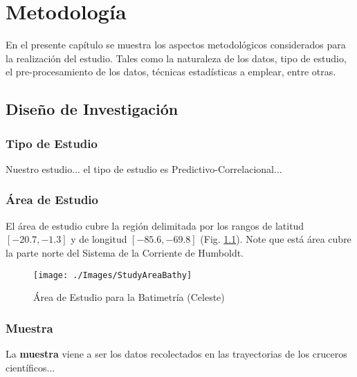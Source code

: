 \chapter{Metodología}
\thispagestyle{empty}
En el presente capítulo se muestra los aspectos metodológicos considerados para la realización del estudio. Tales como la naturaleza de los datos, tipo de estudio, el pre-procesamiento de los datos, técnicas estadísticas a emplear, entre otras.

\section{Diseño de Investigación}
\subsection{Tipo de Estudio}

Nuestro estudio... el tipo de estudio es Predictivo-Correlacional...

\subsection{Área de Estudio}

El área de estudio cubre la región delimitada por los rangos de latitud $[-20.7,-1.3]$ y de longitud $[-85.6,-69.8]$ (Fig. \ref{fig:area_estudio}). Note que está área cubre la parte norte del Sistema de la Corriente de Humboldt.

\begin{figure}[H]
\centering
\texttt{[image: ./Images/StudyAreaBathy]}
\caption{Área de Estudio para la Batimetría (Celeste)}
\label{fig:area_estudio}
\end{figure}

\subsection{Muestra}


La \textbf{muestra} viene a ser los datos recolectados en las trayectorias de los cruceros científicos...

